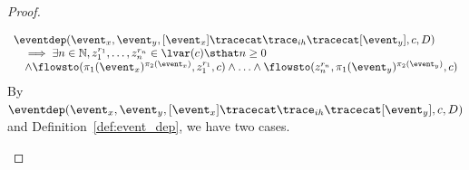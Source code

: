 \begin{proof}
\begin{case}
        \[
          \begin{array}{l}
            \eventdep(\event_x, \event_y, [\event_x] \tracecat \trace_{ih} \tracecat [\event_y], c, D) 
          \\ \quad 
          \implies 
          \exists n \in \mathbb{N}, z_1^{r_1}, \ldots, z_n^{r_n} \in \lvar(c) \sthat  n \geq 0 
          \\ \quad  
          \land
          \flowsto(\pi_1(\event_x)^{\pi_2(\event_x)},  z_1^{r_1}, c) 
          \land \ldots \land \flowsto(z_n^{r_n}, \pi_1(\event_y)^{\pi_2(\event_y)}, c) 
        \end{array}
        \]
        By $\eventdep(\event_x, \event_y, [\event_x] \tracecat \trace_{ih} \tracecat [\event_y], c, D)$ and  Definition~\ref{def:event_dep}, we have two cases.

\end{case}
\end{proof}
